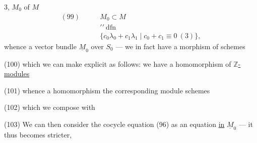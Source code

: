 
$3$, $M_0$ of $M$
\[
\begin{aligned}
(99)\qquad&M_0\subset M\\[-2pt]
&\prime\prime\ \mathrm{dfn}\\[-2pt]
&\{c_0\lambda_0+c_1\lambda_1\mid c_0+c_1\equiv0\ (3)\},
\end{aligned}
\]
whence a vector bundle $\underline M_0$ over $S_0$ ---
we in fact have a morphism of schemes

(100)
which we can make explicit as follows: we have a homomorphism of \uline{$\mathbb Z$-modules}

(101)
whence a homomorphism  the corresponding module schemes

(102)
which we compose with

(103)
We can then consider the cocycle equation (96) as an equation \uline{in}
$\underline M_0$ --- it thus becomes stricter,


